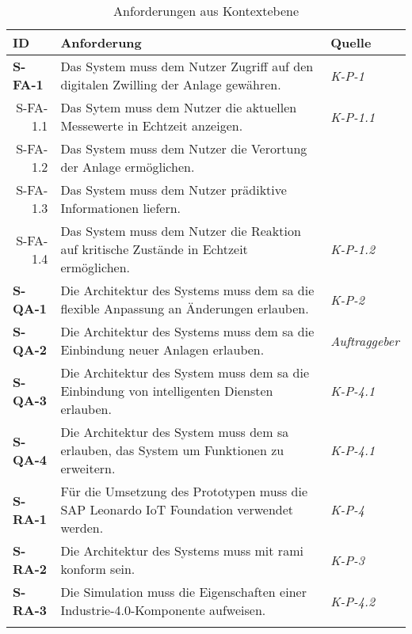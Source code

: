 \begin{table}[ht!]
  \begin{tabularx}{\textwidth}{@{}lXp{2cm}@{}}
      \toprule
      ID                & Anforderung & Quelle \\
      \midrule
      \textbf{S-FA-1}              &  Das System muss dem Nutzer Zugriff auf den digitalen Zwilling der Anlage gewähren.  & \textit{K-P-1}                \\
      \multicolumn{1}{r}{S-FA-1.1} &  Das Sytem muss dem Nutzer die aktuellen Messewerte in Echtzeit anzeigen.    & \textit{K-P-1.1}\\
      \multicolumn{1}{r}{S-FA-1.2} & Das System muss dem Nutzer die Verortung der Anlage ermöglichen. \\
      \multicolumn{1}{r}{S-FA-1.3} & Das System muss dem Nutzer prädiktive Informationen liefern.\\
      \multicolumn{1}{r}{S-FA-1.4} & Das System muss dem Nutzer die Reaktion auf kritische Zustände in Echtzeit ermöglichen.  & \textit{K-P-1.2}\\
      \textbf{S-QA-1}              & Die Architektur des Systems muss dem \ac{sa} die flexible Anpassung an Änderungen erlauben.     & \textit{K-P-2}                \\
      \textbf{S-QA-2}              & Die Architektur des Systems muss dem \ac{sa} die Einbindung neuer Anlagen erlauben.           & \textit{Auftraggeber}                \\
      \textbf{S-QA-3}              &  Die Architektur des System muss dem \ac{sa} die Einbindung von intelligenten Diensten erlauben.  & \textit{K-P-4.1} \\
      \textbf{S-QA-4}              &  Die Architektur des System muss dem \ac{sa} erlauben, das System um Funktionen zu erweitern.  & \textit{K-P-4.1} \\
      \textbf{S-RA-1}              & Für die Umsetzung des Prototypen muss die SAP Leonardo IoT Foundation verwendet werden.       & \textit{K-P-4} \\
      \textbf{S-RA-2}              & Die Architektur des Systems muss mit \ac{rami} konform sein.      & \textit{K-P-3} \\
      \textbf{S-RA-3}              & Die Simulation muss die Eigenschaften einer Industrie-4.0-Komponente aufweisen.      & \textit{K-P-4.2} \\
      \addlinespace
      \bottomrule
  \end{tabularx}
  \caption{Anforderungen aus Kontextebene}
  \label{kontext_anforderungen}
\end{table}

